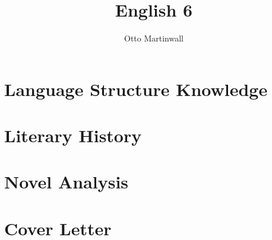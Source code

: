 

\title{English 6}
\author{Otto Martinwall}


\maketitle
\tableofcontents
\newpage
{}

\section{Language Structure Knowledge}


\section{Literary History}


\section{Novel Analysis}


\section{Cover Letter}


